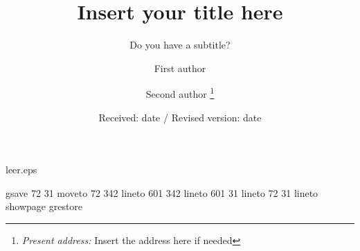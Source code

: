 %
%
%
%
\begin{filecontents}{leer.eps}

gsave
72 31 moveto
72 342 lineto
601 342 lineto
601 31 lineto
72 31 lineto
showpage
grestore
\end{filecontents}
%
\documentclass[agp]{svjour}
%
\usepackage{times}
\usepackage{graphics}
%

%
\title{Insert your title here}
\subtitle{Do you have a subtitle?} %
\author{First author \and Second author%
\thanks{\emph{Present address:} Insert the address here if needed}%
}                     %
%
\offprints{}          %
%
%
\date{Received: date / Revised version: date}
%
%
\maketitle
%
\section{Introduction}
\label{intro}
Your text comes here. Separate text sections with
\section{Section title}
\label{sec:1}
and \citet{RefJ}
